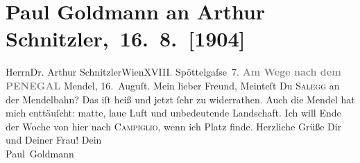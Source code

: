 

         
         \renewcommand{\erwaehntePersonen}{Personen: Paul Goldmann, Olga Schnitzler}
         \renewcommand{\erwaehnteInstitutionen}{Institutionen: Mendelbahn}
         \renewcommand{\erwaehnteOrte}{Orte: Edmund-Weiß-Gasse 7, Hotel Salegg, Madonna di Campiglio, Mende, Monte Penegal, Wien}
         \renewcommand{\erwaehnteWerke}{}
               \section[ Paul Goldmann an Arthur Schnitzler, 16. 8. {[}1904{]}]{ Paul Goldmann an Arthur Schnitzler, 16. 8. {[}1904{]}}\nopagebreak{}\rehead{ }\begin{ledgroupsized}[t]{13cm}\normalsize\beginnumbering{} \toendnotes[C]{\smallbreak\pagebreak[2]} 
\toendnotes[C]{\smallbreak}\pstart{}{\pb}Herrn\pend{}\pstart{}Dr. Arthur Schnitzler\pend{}\pstart{}Wien\pend{}\pstart{}XVIII. Spöttelgaſse 7.\pend{}{\bigskip}\pstart
           \noindent{}\centering{}{\pb}\textcolor{gray}{\textbf{Am Wege nach dem PENEGAL}}\pend
           \pstart
           Mendel, 16. Auguſt.\pend
           \pstart{}Mein lieber Freund,\pend\pstart
           Meinteſt Du \textsc{Salegg} an der Mendelbahn? Das iſt heiß und jetzt
               ſehr zu widerrathen. Auch die Mendel hat mich
               enttäuſcht: matte, laue Luft und unbedeutende Landschaft. Ich will Ende der Woche von
               hier nach \textsc{Campiglio}, wenn ich Platz finde. Herzliche Grüße Dir und Deiner Frau! Dein{\\}\spacefill\mbox{Paul Goldmann}\pend
           
         
         \endnumbering{}\end{ledgroupsized}  \newcommand{\dateiname}{L03451}\newcommand{\titel}{Paul Goldmann an Arthur Schnitzler, 16. 8. [1904]}\newcommand{\editorInnen}{Martin Anton Müller und Laura Untner}
      